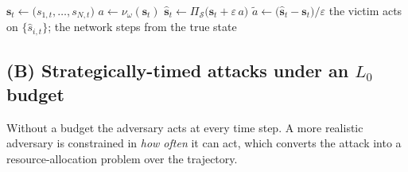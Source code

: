 \begin{algorithm}[H]
\SetAlgoLined
\DontPrintSemicolon
{}
$\mathbf{s}_t \leftarrow \big(s_{1,t}, \dots, s_{N,t}\big)$
$a \leftarrow \nu_\omega(\mathbf{s}_t)$ 
$\hat{\mathbf{s}}_t \leftarrow \Pi_{\mathcal{S}}\big(\mathbf{s}_t + \varepsilon\, a\big)$
$\tilde{a} \leftarrow \big(\hat{\mathbf{s}}_t - \mathbf{s}_t\big) / \varepsilon$
the victim acts on $\{\hat{s}_{i,t}\}$; the network steps from the true state\;
\caption{Coordinated joint perturbation at one time step}
\label{alg:coordinated_attack}
\end{algorithm}

\subsection{(B) Strategically-timed attacks under an \texorpdfstring{$L_0$}{L0} budget}
\label{subsec:timed_attack}

Without a budget the adversary acts at every time step. A more realistic adversary is
constrained in \emph{how often} it can act, which converts the attack into a
resource-allocation problem over the trajectory.


